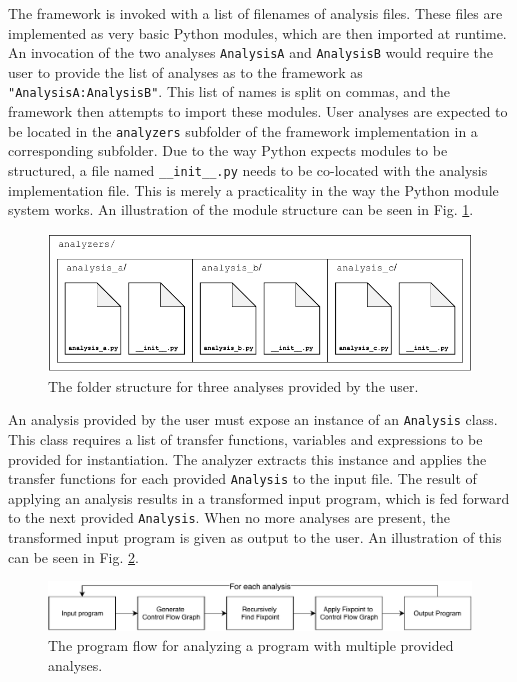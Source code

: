 \newpar The framework is invoked with a list of filenames of analysis files. These files are implemented as very basic Python modules, which are then imported at runtime. An invocation of the two analyses \texttt{AnalysisA} and \texttt{AnalysisB} would require the user to provide the list of analyses as to the framework as \texttt{"AnalysisA:AnalysisB"}. This list of names is split on commas, and the framework then attempts to import these modules. 
User analyses are expected to be located in the \texttt{analyzers} subfolder of the framework implementation in a corresponding subfolder. Due to the way Python expects modules to be structured, a file named \texttt{\_\_init\_\_.py} needs to be co-located with the analysis implementation file. This is merely a practicality in the way the Python module system works. An illustration of the module structure can be seen in Fig. \ref{fig:modulestructure}.

\begin{figure}[H]
    \centering
    \includegraphics{implementation/figures/folderstructure}
    \caption{The folder structure for three analyses provided by the user.}
    \label{fig:modulestructure}
\end{figure}

\newpar An analysis provided by the user must expose an instance of an \texttt{Analysis} class. This class requires a list of transfer functions, variables and expressions to be provided for instantiation. The analyzer extracts this instance and applies the transfer functions for each provided \texttt{Analysis} to the input file. The result of applying an analysis results in a transformed input program, which is fed forward to the next provided \texttt{Analysis}. When no more analyses are present, the transformed input program is given as output to the user. An illustration of this can be seen in Fig. \ref{fig:programflow}.

\begin{figure}[H]
    \centering
    \includegraphics[width=\textwidth]{implementation/figures/programflow}
    \caption{The program flow for analyzing a program with multiple provided analyses.}
    \label{fig:programflow}
\end{figure}

